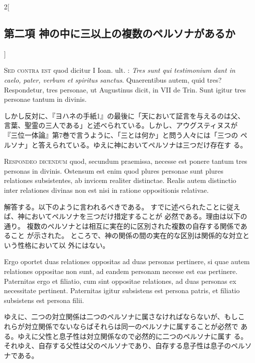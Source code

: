 \documentclass[paper=a4paper,fontsize=10pt,jafontsize=9pt,titlepage]{jlreq}
\begin{document}
\begin{paracol}{2}[\subsection{第二項 神の中に三以上の複数のペルソナがあるか}]
\switchcolumn*[\subsection{s.c.}]


{\scshape Sed contra est} quod dicitur I Ioan. ult. : {\itshape Tres sunt qui testimonium
dant in caelo, pater, verbum et spiritus sanctus}. Quaerentibus autem,
quid tres? Respondetur, tres personae, ut Augustinus dicit, in VII de
Trin. Sunt igitur tres personae tantum in divinis.


\switchcolumn


しかし反対に、『ヨハネの手紙1』の最後に「天において証言を与えるのは父、
 言葉、聖霊の三人である」と述べられている。しかし、アウグスティヌスが
 『三位一体論』第7巻で言うように、「三とは何か」と問う人々には「三つの
 ペルソナ」と答えられている。ゆえに神においてペルソナは三つだけ存在す
 る。




{\scshape Respondeo dicendum} quod, secundum praemissa, necesse est ponere tantum
tres personas in divinis. Ostensum est enim quod plures personae sunt
plures relationes subsistentes, ab invicem realiter distinctae. Realis
autem distinctio inter relationes divinas non est nisi in ratione
oppositionis relativae.


\switchcolumn


解答する。以下のように言われるべきである。
すでに述べられたことに従えば、神においてペルソナを三つだけ措定することが
 必然である。理由は以下の通り。
複数のペルソナとは相互に実在的に区別された複数の自存する関係であること
 が示された。
ところで、神の関係の間の実在的な区別は関係的な対立という性格において以
 外にはない。


\switchcolumn*


Ergo oportet duas relationes oppositas ad duas
personas pertinere, si quae autem relationes oppositae non sunt, ad
eandem personam necesse est eas pertinere. Paternitas ergo et
filiatio, cum sint oppositae relationes, ad duas personas ex
necessitate pertinent. Paternitas igitur subsistens est persona
patris, et filiatio subsistens est persona filii.


\switchcolumn


ゆえに、二つの対立関係は二つのペルソナに属さなければならないが、もしこ
 れらが対立関係でないならばそれらは同一のペルソナに属することが必然で
 ある。ゆえに父性と息子性は対立関係なので必然的に二つのペルソナに属す
 る。それゆえ、自存する父性は父のペルソナであり、自存する息子性は息子のペルソ
 ナである。



\end{paracol}
\end{document}
